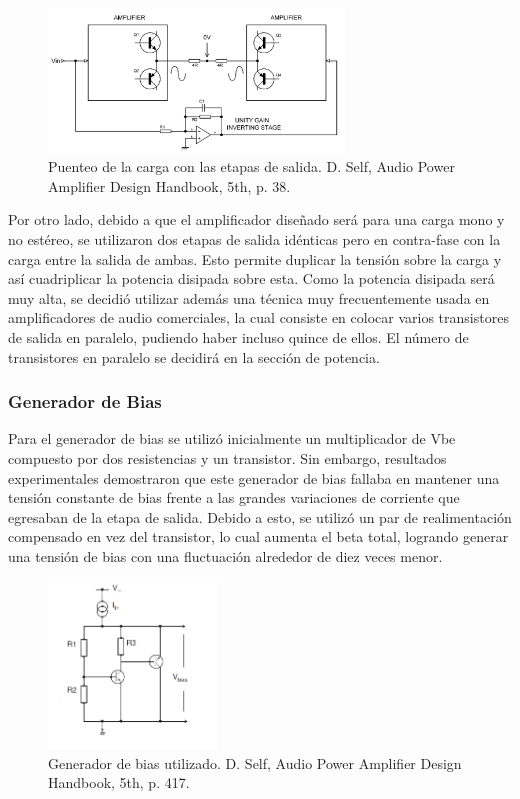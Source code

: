 \begin{figure}[H]
\centering
	\includegraphics[width=0.7\textwidth]{ImagenesOutput-Stage/pag38-bridge.png}
	\caption{Puenteo de la carga con las etapas de salida. D. Self, Audio Power Amplifier Design Handbook, 5th, p. 38.}
	\label{fig:bridge}
\end{figure}

Por otro lado, debido a que el amplificador diseñado será para una carga mono y no estéreo, se utilizaron dos etapas de salida idénticas pero en contra-fase con la carga entre la salida de ambas. Esto permite duplicar la tensión sobre la carga y así cuadriplicar la potencia disipada sobre esta.
Como la potencia disipada será muy alta, se decidió utilizar además una técnica muy frecuentemente usada en amplificadores de audio comerciales, la cual consiste en colocar varios transistores de salida en paralelo, pudiendo haber incluso quince de ellos. El número de transistores en paralelo se decidirá en la sección de potencia.

\subsubsection{Generador de Bias}

Para el generador de bias se utilizó inicialmente un multiplicador de Vbe compuesto por dos resistencias y un transistor. Sin embargo, resultados experimentales demostraron que este generador de bias fallaba en mantener una tensión constante de bias frente a las grandes variaciones de corriente que egresaban de la etapa de salida. Debido a esto, se utilizó un par de realimentación compensado en vez del transistor, lo cual aumenta el beta total, logrando generar una tensión de bias con una fluctuación alrededor de diez veces menor.

\begin{figure}[H]
\centering
	\includegraphics[width=0.4\textwidth]{ImagenesOutput-Stage/pag417-bias.png}
	\caption{Generador de bias utilizado. D. Self, Audio Power Amplifier Design Handbook, 5th, p. 417.}
	\label{fig:bias}
\end{figure}

